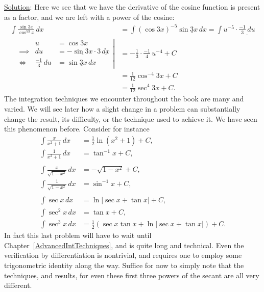 \underline{Solution}:  Here we see that we have
the derivative of the cosine function is present as a factor,
and we are left with a power of the cosine:
\begin{align*}
\int\frac{\sin3x}{\cos^53x}\,dx
 &=\int(\cos3x)^{-5}\underline{\sin3x\,dx}
  =\int u^{-5}\cdot\underline{\frac{-1}3\,du}\\
\left.\begin{alignedat}{2}
&&u&=\cos3x\\
&\implies&du&=-\underline{\sin3x}\cdot3\,\underline{dx}\\
&\iff&\frac{-1}3\,du&=\underline{\sin3x\,dx}
\end{alignedat}\right|
&=-\frac13\cdot\frac{-1}4\,u^{-4}+C\\
&=\frac1{12}\cos^{-4}3x+C\\
&=\frac1{12}\sec^{4}3x+C.
\end{align*}
\eex
The integration techniques we encounter throughout the book are
many and varied.  We will see later how a slight change in a problem
can substantially change the result, its difficulty,
or the technique used to achieve it.  We have seen this phenomenon
before.  Consider for instance
\begin{align*}
\int\frac{x}{x^2+1}\,dx&=\frac12\ln\left(x^2+1\right)+C,\\
\int\frac{1}{x^2+1}\,dx&=\tan^{-1}x+C,\\
\\
\int\frac{x}{\sqrt{1-x^2}}\,dx&=-\sqrt{1-x^2}+C,\\
\int\frac1{\sqrt{1-x^2}}\,dx&=\sin^{-1}x+C,\\
\\
\int\sec x\,dx&=\ln|\sec x+\tan x|+C,\\
\int\sec^2x\,dx&=\tan x+C,\\
\int\sec^3x\,dx&=\frac12(\sec x\tan x+\ln|\sec x+\tan x|)+C.
\end{align*}
In fact this last problem will have to wait until 
Chapter~\ref{AdvancedIntTechniques}, and is quite long and technical.
Even the verification by differentiation is nontrivial, and
requires one to employ some trigonometric identity along the way.
Suffice for now 
to simply note that the techniques, and results,
for even these first three powers of
the secant are all very different.

